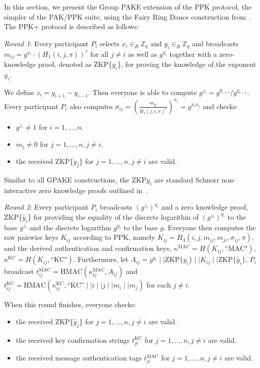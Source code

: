 In this section, we present the Group PAKE extension of the PPK protocol, the simpler of the PAK/PPK
suite, using the Fairy Ring Dance construction from~\cite{HaYiChSh15}. The PPK+ protocol is described as follows:

\emph{Round 1}: Every participant $P_i$ selects $x_i\in_R \mathbb{Z}_q$ and $y_i\in_R \mathbb{Z}_q$ and 
broadcasts $m_{ij} = g^{x_i}\cdot (H_1(i, j, \pi))^r$ for all $j \neq i$ as well as $g^{y_i}$ together with a 
zero-knowledge proof, denoted as ZKP\{$y_i$\}, for proving the knowledge of the exponent $y_i$.

We define $z_i = y_{i+1} - y_{i-1}$. Then everyone is able to compute $g^{z_i} = g^{y_{i+1}}/g^{y_{i-1}}$. 
Every participant $P_i$ also computes $\sigma_{ij} = \left(\frac{m_{ji}}{H_1(j,i,\pi)^r}\right)^{x_i} = g^{x_i x_j}$
and checks:
\begin{itemize}
\item $g^{z_i} \neq 1$ for $i = 1, \ldots, n$.
\item $m_j \neq 0$ for $j = 1,\ldots,n, j\neq i$.
\item the received ZKP\{$y_j$\} for $j = 1,\ldots, n, j\neq i$ are valid.
\end{itemize}

Similar to all GPAKE constructions, the ZKP{$y_i$} are standard Schnorr non-interactive zero knowledge proofs outlined in~\cite{HaYiChSh15}.

\emph{Round 2}: Every participant $P_i$ broadcasts $(g^{z_i})^{y_i}$ and a zero knowledge proof,
ZKP\{$\tilde{y_i}$\} for providing the equality of the discrete logarithm of $(g^{z_i})^{y_i}$ to the base
$g^{z_i}$ and the discrete logarithm $g^{y_i}$ to the base $g$. Everyone then computes the raw pairwise
keys $K_{ij}$ according to PPK, namely $K_{ij} = H_3(i,j,m_{ij}, m_{ji}, \sigma_{ij}, \pi)$, and the derived
authentication and confirmation keys, $\kappa^{\text{MAC}} = H(K_{ij}, \text{``MAC"})$,
$\kappa^{\text{KC}} = H(K_{ij}, \text{``KC"})$. Furthermore, let
$A_{ij} = g^{y_i}\mid\mid \text{ZKP}\{y_i\}\mid\mid K_{ij}\mid\mid \text{ZKP}\{\tilde{y_i}\}$,
$P_i$ broadcast $t_{ij}^{\text{MAC}}  =\text{HMAC}(\kappa^{\text{MAC}}_{ij}, A_{ij})$ and
$t_{ij}^{\text{KC}}  = \text{HMAC}(\kappa^{\text{KC}}_{ij}, \text{``KC''}\mid\mid i\mid\mid j \mid\mid m_i \mid\mid m_j)$ for each $j \neq i$.


When this round finishes, everyone checks:
\begin{itemize}
\item the received ZKP\{$\tilde{y_j}$\} for $j = 1,\ldots, n, j\neq i$ are valid.
\item the received key confirmation strings $t^{\text{KC}}_{ji}$ for $j = 1,\ldots, n, j\neq i$ are valid.
\item the received message authentication tags $t^{\text{MAC}}_{ji}$ for $j = 1,\ldots, n, j\neq i$ are valid.
\end{itemize}

